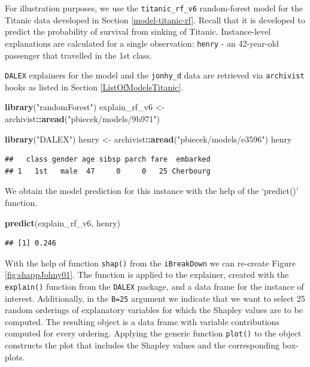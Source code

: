 \documentclass[12pt,]{krantz}
\newenvironment{Shaded}{\begin{snugshade}}{\end{snugshade}}
\newcommand{\KeywordTok}[1]{\textcolor[rgb]{0.13,0.29,0.53}{\textbf{#1}}}
\newcommand{\NormalTok}[1]{#1}
\newcommand{\OperatorTok}[1]{\textcolor[rgb]{0.81,0.36,0.00}{\textbf{#1}}}
\newcommand{\StringTok}[1]{\textcolor[rgb]{0.31,0.60,0.02}{#1}}
\begin{document}
For illustration purposes, we use the \texttt{titanic\_rf\_v6} random-forest model for the Titanic data developed in Section \ref{model-titanic-rf}. Recall that it is developed to predict the probability of survival from sinking of Titanic. Instance-level explanations are calculated for a single observation: \texttt{henry} - an 42-year-old passenger that travelled in the 1st class.

\texttt{DALEX} explainers for the model and the \texttt{jonhy\_d} data are retrieved via \texttt{archivist} hooks as listed in Section \ref{ListOfModelsTitanic}.

\begin{Shaded}
\begin{Highlighting}[]
\KeywordTok{library}\NormalTok{(}\StringTok{"randomForest"}\NormalTok{)}
\NormalTok{explain_rf_v6 <-}\StringTok{ }\NormalTok{archivist}\OperatorTok{::}\KeywordTok{aread}\NormalTok{(}\StringTok{"pbiecek/models/9b971"}\NormalTok{)}

\KeywordTok{library}\NormalTok{(}\StringTok{"DALEX"}\NormalTok{)}
\NormalTok{henry <-}\StringTok{ }\NormalTok{archivist}\OperatorTok{::}\KeywordTok{aread}\NormalTok{(}\StringTok{"pbiecek/models/e3596"}\NormalTok{)}
\NormalTok{henry}
\end{Highlighting}
\end{Shaded}

\begin{verbatim}
##   class gender age sibsp parch fare  embarked
## 1   1st   male  47     0     0   25 Cherbourg
\end{verbatim}

We obtain the model prediction for this instance with the help of the `predict()' function.

\begin{Shaded}
\begin{Highlighting}[]
\KeywordTok{predict}\NormalTok{(explain_rf_v6, henry)}
\end{Highlighting}
\end{Shaded}

\begin{verbatim}
## [1] 0.246
\end{verbatim}

With the help of function \texttt{shap()} from the \texttt{iBreakDown} we can re-create Figure \ref{fig:shappJohny01}. The function is applied to the explainer, created with the \texttt{explain()} function from the \texttt{DALEX} package, and a data frame for the instance of interest. Additionally, in the \texttt{B=25} argument we indicate that we want to select 25 random orderings of explanatory variables for which the Shapley values are to be computed. The resulting object is a data frame with variable contributions computed for every ordering. Applying the generic function \texttt{plot()} to the object constructs the plot that includes the Shapley values and the corresponding box-plots.
\end{document}
